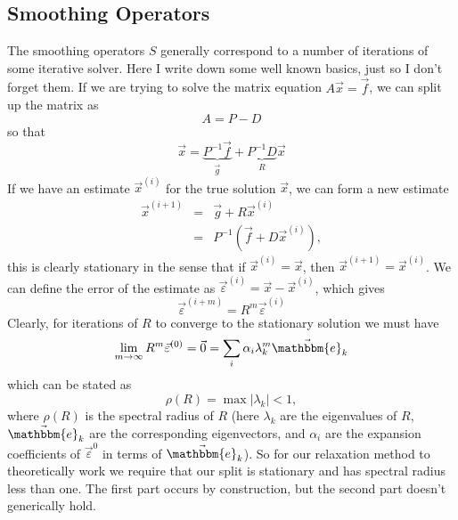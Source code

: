 \documentclass{article}
\begin{document}

\subsection{Smoothing Operators}
The smoothing operators $S$ generally correspond to a number of iterations of some iterative solver. Here I write down some well known basics, just so I don't forget them. If we are trying to solve the matrix equation $A \vec{x} = \vec{f}$, we can split up the matrix as 
\begin{equation}
    A = P - D 
\end{equation}
so that 
\begin{equation}
\vec{x} = \underbrace{P^{-1} \vec{f}}_{\vec{g}} + \underbrace{P^{-1}D}_R  \vec{x} 
\end{equation} 
If we have an estimate $\vec{x}^{(i)}$ for the true solution $\vec{x}$, we can form a new estimate 
\begin{eqnarray}
    \vec{x}^{(i+1)} &=& \vec{g} + R \vec{x}^{(i)} \nonumber\\
    &=& P^{-1} \left(\vec{f} + D \vec{x}^{(i)} \right),
\end{eqnarray}
this is clearly stationary in the sense that if $\vec{x}^{(i)} = \vec{x}$, then $\vec{x}^{(i+1)} = \vec{x}^{(i)}$.
We can define the error of the estimate as $\vec{\varepsilon}^{(i)} = \vec{x} - \vec{x}^{(i)}$, which gives
\begin{equation}
\vec{\varepsilon}^{(i+m)} = R^m \vec{\varepsilon}^{(i)} 
\end{equation} 
Clearly, for iterations of $R$ to converge to the stationary solution we must have 
\begin{equation}
    \lim_{m \rightarrow \infty} R^m \vec{\varepsilon}^{(0)} = \vec{0} = \sum_i \alpha_i \lambda^m_k \vec{\mathbbm{e}}_k
\end{equation}
which can be stated as 
\begin{equation} 
\rho(R) = \max |\lambda_k| < 1,
\end{equation} 
where $\rho(R)$ is the spectral radius of $R$ (here $\lambda_k$ are the eigenvalues of $R$, $\vec{\mathbbm{e}}_k$ are the corresponding eigenvectors, and $\alpha_i$ are the expansion coefficients of $\vec{\varepsilon}^{0}$ in terms of $\vec{\mathbbm{e}}_k$). So for our relaxation method to theoretically work we require that our split is stationary and has spectral radius less than one. The first part occurs by construction, but the second part doesn't generically hold. 
\end{document}
